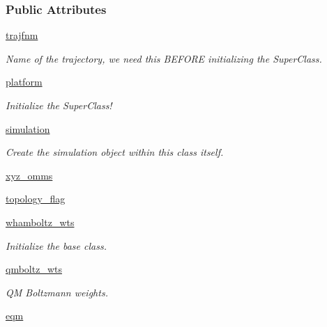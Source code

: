 \subsubsection*{Public Attributes}
\begin{DoxyCompactItemize}
\item 
\hyperlink{classforcebalance_1_1openmmio_1_1AbInitio__OpenMM_abcf5ab6d976ea05c774b8c18b5262b68}{trajfnm}
\begin{DoxyCompactList}\small\item\em Name of the trajectory, we need this B\-E\-F\-O\-R\-E initializing the Super\-Class. \end{DoxyCompactList}\item 
\hyperlink{classforcebalance_1_1openmmio_1_1AbInitio__OpenMM_ae6977017b553e5d6dd47258f67fcdf1c}{platform}
\begin{DoxyCompactList}\small\item\em Initialize the Super\-Class! \end{DoxyCompactList}\item 
\hyperlink{classforcebalance_1_1openmmio_1_1AbInitio__OpenMM_ad999b78640bdd1bb9ea09f5ce82c95d7}{simulation}
\begin{DoxyCompactList}\small\item\em Create the simulation object within this class itself. \end{DoxyCompactList}\item 
\hyperlink{classforcebalance_1_1openmmio_1_1AbInitio__OpenMM_a355176032e08dff544b81a12d8e82a9e}{xyz\-\_\-omms}
\item 
\hyperlink{classforcebalance_1_1openmmio_1_1AbInitio__OpenMM_ab4e95ab839ecd731ac7805c8a3ed08aa}{topology\-\_\-flag}
\item 
\hyperlink{classforcebalance_1_1abinitio_1_1AbInitio_a885e7ef58b9e7c6abbc24321e5f3c61a}{whamboltz\-\_\-wts}
\begin{DoxyCompactList}\small\item\em Initialize the base class. \end{DoxyCompactList}\item 
\hyperlink{classforcebalance_1_1abinitio_1_1AbInitio_a06ec6b12d81791ca94f599f41e56335a}{qmboltz\-\_\-wts}
\begin{DoxyCompactList}\small\item\em Q\-M Boltzmann weights. \end{DoxyCompactList}\item 
\hyperlink{classforcebalance_1_1abinitio_1_1AbInitio_a64387fae9bdfb0d03ca6961e67c779be}{eqm}

\end{DoxyCompactItemize}
